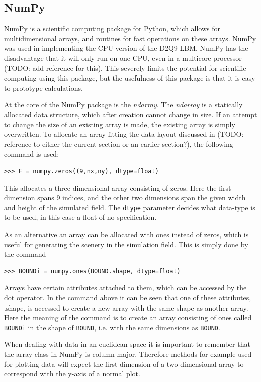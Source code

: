 \subsection{NumPy}
NumPy is a scientific computing package for Python, which allows for multidimensional arrays, and routines for fast operations on these arrays. NumPy was used in implementing the CPU-version of the D2Q9-LBM. NumPy has the disadvantage that it will only run on one CPU, even in a multicore processor (TODO: add reference for this). This severely limits the potential for scientific computing using this package, but the usefulness of this package is that it is easy to prototype calculations.

At the core of the NumPy package is the \textit{ndarray}. The \textit{ndarray} is a statically allocated data structure, which after creation cannot change in size. If an attempt to change the size of an existing array is made, the existing array is simply overwritten. To allocate an array fitting the data layout discussed in (TODO: reference to either the current section or an earlier section?), the following command is used:

\begin{verbatim}
>>> F = numpy.zeros((9,nx,ny), dtype=float)
\end{verbatim}

This allocates a three dimensional array consisting of zeros. Here the first dimension spans 9 indices, and the other two dimensions span the given width and height of the simulated field. The \texttt{dtype} parameter decides what data-type is to be used, in this case a float of no specification. 

As an alternative an array can be allocated with ones instead of zeros, which is useful for generating the scenery in the simulation field. This is simply done by the command

\begin{verbatim}
>>> BOUNDi = numpy.ones(BOUND.shape, dtype=float)
\end{verbatim}

Arrays have certain attributes attached to them, which can be accessed by the dot operator. In the command above it can be seen that one of these attributes, .shape, is accessed to create a new array with the same shape as another array. Here the meaning of the command is to create an array consisting of ones called \texttt{BOUNDi} in the shape of \texttt{BOUND}, i.e. with the same dimensions as \texttt{BOUND}.

When dealing with data in an euclidean space it is important to remember that the array class in NumPy is column major. Therefore methods for example used for plotting data will expect the first dimension of a two-dimensional array to correspond with the y-axis of a normal plot. 

